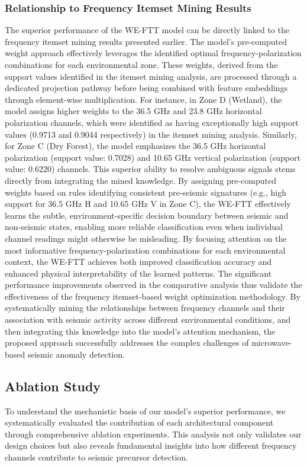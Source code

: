 \documentclass[fleqn,10pt]{wlscirep_mdpi_style}
\begin{document}
\subsubsection{Relationship to Frequency Itemset Mining Results}
The superior performance of the WE-FTT model can be directly linked to the frequency itemset mining results presented earlier. The model's pre-computed weight approach effectively leverages the identified optimal frequency-polarization combinations for each environmental zone. These weights, derived from the support values identified in the itemset mining analysis, are processed through a dedicated projection pathway before being combined with feature embeddings through element-wise multiplication. For instance, in Zone D (Wetland), the model assigns higher weights to the 36.5 GHz and 23.8 GHz horizontal polarization channels, which were identified as having exceptionally high support values (0.9713 and 0.9044 respectively) in the itemset mining analysis. Similarly, for Zone C (Dry Forest), the model emphasizes the 36.5 GHz horizontal polarization (support value: 0.7028) and 10.65 GHz vertical polarization (support value: 0.6220) channels.
This superior ability to resolve ambiguous signals stems directly from integrating the mined knowledge. By assigning pre-computed weights based on rules identifying consistent pre-seismic signatures (e.g., high support for 36.5 GHz H and 10.65 GHz V in Zone C), the WE-FTT effectively learns the subtle, environment-specific decision boundary between seismic and non-seismic states, enabling more reliable classification even when individual channel readings might otherwise be misleading. By focusing attention on the most informative frequency-polarization combinations for each environmental context, the WE-FTT achieves both improved classification accuracy and enhanced physical interpretability of the learned patterns.
The significant performance improvements observed in the comparative analysis thus validate the effectiveness of the frequency itemset-based weight optimization methodology. By systematically mining the relationships between frequency channels and their association with seismic activity across different environmental conditions, and then integrating this knowledge into the model's attention mechanism, the proposed approach successfully addresses the complex challenges of microwave-based seismic anomaly detection.

\subsection{Ablation Study}
To understand the mechanistic basis of our model's superior performance, we systematically evaluated the contribution of each architectural component through comprehensive ablation experiments. This analysis not only validates our design choices but also reveals fundamental insights into how different frequency channels contribute to seismic precursor detection.
\end{document}
